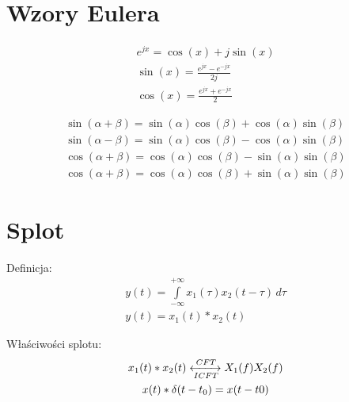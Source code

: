 \section{Wzory Eulera}
% 
\begin{multicols}{2}
    \begin{gather*}
        e^{jx} = \cos{(x)} + j\sin{(x)}\\
        \sin{(x)} = \frac{e^{jx}-e^{-jx}}{2j}\\
        \cos{(x)} = \frac{e^{jx}+e^{-jx}}{2}
    \end{gather*}
 
    \begin{gather*}
        \sin{(\alpha+\beta)} = \sin{(\alpha)}\cos{(\beta)} + \cos{(\alpha)}\sin{(\beta)}\\
        \sin{(\alpha-\beta)} = \sin{(\alpha)}\cos{(\beta)} - \cos{(\alpha)}\sin{(\beta)}\\
        \cos{(\alpha+\beta)} = \cos{(\alpha)}\cos{(\beta)} - \sin{(\alpha)}\sin{(\beta)}\\
        \cos{(\alpha+\beta)} = \cos{(\alpha)}\cos{(\beta)} + \sin{(\alpha)}\sin{(\beta)}
    \end{gather*}
\end{multicols}

\section{Splot}
    Definicja:
    \begin{gather*}
        y(t) = \int \limits _{-\infty}^{+\infty}x_1(\tau) x_2(t-\tau) \,d\tau\\
        y(t) = x_1(t)*x_2(t) 
    \end{gather*}

    Właściwości splotu:
    \begin{gather*}
        x_1(t)*x_2(t)\xleftrightarrow[ICFT]{CFT} X_1(f)X_2(f)\\
        x(t)*\delta(t-t_0) = x(t-t0)
    \end{gather*}
